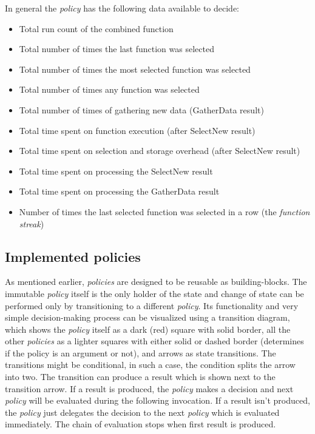 In general the \textit{policy} has the following data available to decide:

\begin{itemize}
	\item Total run count of the combined function
	\item Total number of times the last function was selected
	\item Total number of times the most selected function was selected
	\item Total number of times any function was selected
	\item Total number of times of gathering new data (GatherData result)
	\item Total time spent on function execution (after SelectNew result)
	\item Total time spent on selection and storage overhead (after SelectNew result)
	\item Total time spent on processing the SelectNew result
	\item Total time spent on processing the GatherData result
	\item Number of times the last selected function was selected in a row (the \textit{function streak})
\end{itemize}

\subsection{Implemented policies}

As mentioned earlier, \textit{policies} are designed to be reusable as building-blocks. The immutable \textit{policy} itself is the only holder of the state and change of state can be performed only by transitioning to a different \textit{policy}. Its functionality and very simple decision-making process can be visualized using a transition diagram, which shows the \textit{policy} itself as a dark (red) square with solid border, all the other \textit{policies} as a lighter squares with either solid or dashed border (determines if the policy is an argument or not), and arrows as state transitions. The transitions might be conditional, in such a case, the condition splits the arrow into two. The transition can produce a result which is shown next to the transition arrow. If a result is produced, the \textit{policy} makes a decision and next \textit{policy} will be evaluated during the following invocation. If a result isn't produced, the \textit{policy} just delegates the decision to the next \textit{policy} which is evaluated immediately. The chain of evaluation stops when first result is produced.

